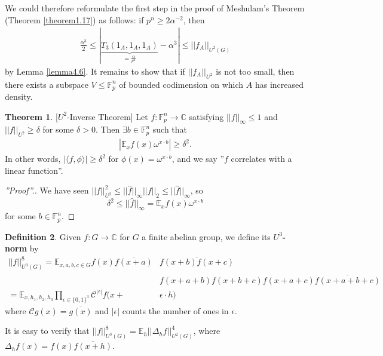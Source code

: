 \documentclass{article}
\theoremstyle{definition}
\newtheorem{theorem}{Theorem}[section]
\newtheorem{defn}[theorem]{Definition}
\begin{document}
We could therefore reformulate the first step in the proof of Meshulam's Theorem (Theorem \ref{theorem1.17}) as follows: if $p^n\ge 2\alpha^{-2}$, then 
\begin{align*}
   \frac{\alpha^3}{2}\le |\underbrace{T_3(1_A,1_A,1_A)}_{=\frac{\alpha}{p^n}}-\alpha^3| \le ||f_A||_{U^2(G)}
\end{align*}
by Lemma \ref{lemma4.6}. It remains to show that if $||f_A||_{U^2}$ is not too small, then there exists a subspace $V \le \mathbb{F}_p^n$ of bounded codimension on which $A$ has increased density.
\begin{theorem}\label{theorem4.7}[$U^2$-Inverse Theorem]
    Let $f : \mathbb{F}_p^n \to \mathbb{C}$ satisfying $||f||_{\infty}\le 1$ and $||f||_{U^2}\ge \delta$ for some $\delta>0$. Then $\exists b \in \mathbb{F}_p^n$ such that 
    \begin{align*}
        \left|\mathbb{E}_{x} f(x)\omega^{x\cdot b}\right| \ge \delta^2.
    \end{align*}
    In other words, $\left|\langle f, \phi \rangle\right|\ge \delta^2$ for $\phi(x)=\omega^{x\cdot b}$, and we say ''$f$ correlates with a linear function''.
\end{theorem}
\begin{proof}[''Proof''.]
    We have seen $||f||_{U^2}^2 \le ||\widehat{f}||_{\infty}||f||_2 \le ||\widehat{f}||_{\infty}$, so \[
    \delta^2 \le ||\widehat{f}||_{\infty} = \mathbb{E}_x f(x)\omega^{x\cdot b}
    \]
    for some $b \in \mathbb{F}_p^n$.
\end{proof}
\begin{defn}\label{defn4.8}
    Given $f : G \to \mathbb{C}$ for $G$ a finite abelian group, we define its \textbf{$U^3$-norm} by 
    \begin{align*}
        ||f||_{U^3(G)}^8 = \mathbb{E}_{x,a,b,c \in G}f(x)\overline{f(x+a)}&\overline{f(x+b)f(x+c)}\\
        &f(x+a+b)f(x+b+c)f(x+a+c)\overline{f(x+a+b+c)}\\
        = \mathbb{E}_{x,h_1,h_2,h_3} \prod_{\epsilon \in \{0,1\}^3}^{} \mathcal{C}^{\left|\epsilon\right|}f(x+&\epsilon\cdot h)
    \end{align*}
    where $\mathcal{C}g(x) = \overline{g(x)}$ and $\left|\epsilon\right|$ counts the number of ones in $\epsilon$.
\end{defn}

It is easy to verify that $||f||_{U^3(G)}^8 = \mathbb{E}_{h}||\Delta_h f||_{U^2(G)}^4$, where $\Delta_h f(x) = f(x)\overline{f(x+h)}$.
\end{document}
